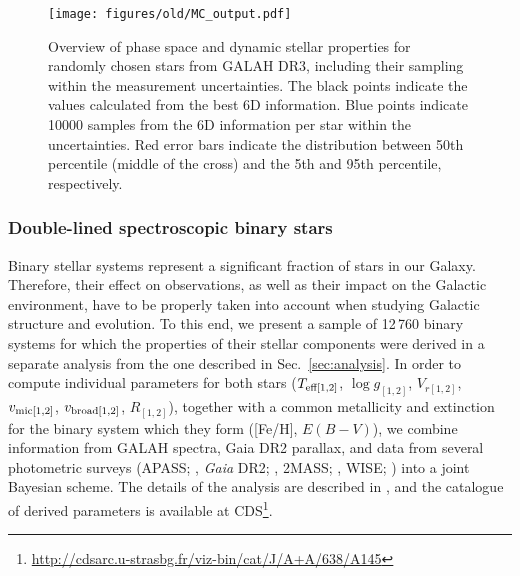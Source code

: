 \documentclass[fleqn,usenatbib,useAMS]{mnras}
\begin{document}
\begin{figure}
\centering
\texttt{[image: figures/old/MC\_output.pdf]}
  \caption[{Overview of phase space and dynamic stellar properties for randomly chosen stars from GALAH DR3, including their sampling within the measurement uncertainties.}]{Overview of phase space and dynamic stellar properties for randomly chosen stars from GALAH DR3, including their sampling within the measurement uncertainties. The black points indicate the values calculated from the best 6D information. Blue points indicate 10000 samples from the 6D information per star within the uncertainties. Red error bars indicate the distribution between 50th percentile (middle of the cross) and the 5th and 95th percentile, respectively.}
  \label{fig:MC_output}
\end{figure}

\subsubsection{Double-lined spectroscopic binary stars}

Binary stellar systems represent a significant fraction of stars in our Galaxy. Therefore, their effect on observations, as well as their impact on the Galactic environment, have to be properly taken into account when studying Galactic structure and evolution. To this end, we present a sample of 12\,760 binary systems for which the properties of their stellar components were derived in a separate analysis from the one described in Sec.~\ref{sec:analysis}. In order to compute individual parameters for both stars ($T_{\rm eff[1,2]}$, $\log g_{[1,2]}$, $V_{r[1,2]}$, $v_{\rm mic[1,2]}$, $v_{\rm broad[1,2]}$, $R_{[1,2]}$), together with a common metallicity and extinction for the binary system which they form ([Fe/H], $E(B-V)$), we combine information from GALAH spectra, Gaia DR2 parallax, and data from several photometric surveys (APASS; \citealt{APASS}, \textit{Gaia} DR2; \citealt{Brown2018}, 2MASS; \citealt{Skrutskie2006}, WISE; \citealt{Cutri2013}) into a joint Bayesian scheme. The details of the analysis are described in \citet{Traven2020}, and the catalogue of derived parameters is available at CDS\footnote{\url{http://cdsarc.u-strasbg.fr/viz-bin/cat/J/A+A/638/A145}}. 
\end{document}
